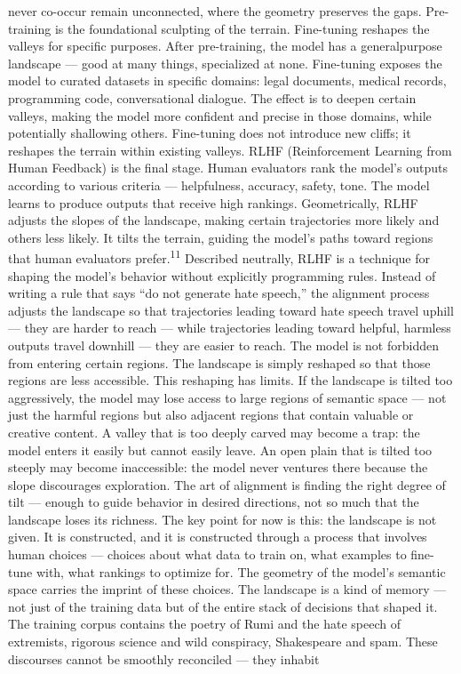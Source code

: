 never co-occur remain unconnected, where the geometry preserves the gaps. Pre-training is the foundational sculpting of the terrain. Fine-tuning reshapes the valleys for specific purposes. After pre-training, the model has a generalpurpose landscape — good at many things, specialized at none. Fine-tuning exposes the model to curated datasets in specific domains: legal documents, medical records, programming code, conversational dialogue. The effect is to deepen certain valleys, making the model more confident and precise in those domains, while potentially shallowing others. Fine-tuning does not introduce new cliffs; it reshapes the terrain within existing valleys. RLHF (Reinforcement Learning from Human Feedback) is the final stage. Human evaluators rank the model’s outputs according to various criteria — helpfulness, accuracy, safety, tone. The model learns to produce outputs that receive high rankings. Geometrically, RLHF adjusts the slopes of the landscape, making certain trajectories more likely and others less likely. It tilts the terrain, guiding the model’s paths toward regions that human evaluators prefer.\textsuperscript{11} Described neutrally, RLHF is a technique for shaping the model’s behavior without explicitly programming rules. Instead of writing a rule that says “do not generate hate speech,” the alignment process adjusts the landscape so that trajectories leading toward hate speech travel uphill — they are harder to reach — while trajectories leading toward helpful, harmless outputs travel downhill — they are easier to reach. The model is not forbidden from entering certain regions. The landscape is simply reshaped so that those regions are less accessible. This reshaping has limits. If the landscape is tilted too aggressively, the model may lose access to large regions of semantic space — not just the harmful regions but also adjacent regions that contain valuable or creative content. A valley that is too deeply carved may become a trap: the model enters it easily but cannot easily leave. An open plain that is tilted too steeply may become inaccessible: the model never ventures there because the slope discourages exploration. The art of alignment is finding the right degree of tilt — enough to guide behavior in desired directions, not so much that the landscape loses its richness. The key point for now is this: the landscape is not given. It is constructed, and it is constructed through a process that involves human choices — choices about what data to train on, what examples to fine-tune with, what rankings to optimize for. The geometry of the model’s semantic space carries the imprint of these choices. The landscape is a kind of memory — not just of the training data but of the entire stack of decisions that shaped it. The training corpus contains the poetry of Rumi and the hate speech of extremists, rigorous science and wild conspiracy, Shakespeare and spam. These discourses cannot be smoothly reconciled — they inhabit

